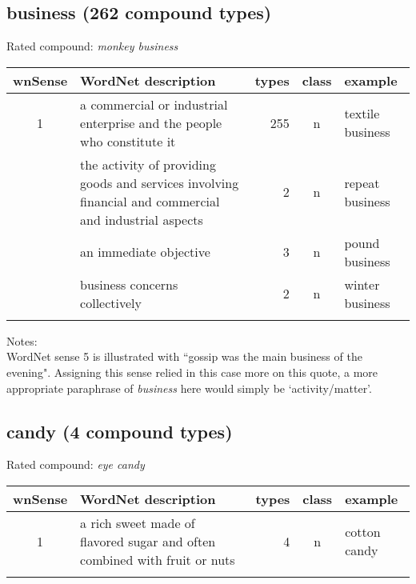 \subsection{business (262 compound types)}
Rated compound: \emph{monkey business}


\noindent
\begin{longtable}{c>{\raggedright\arraybackslash}p{5cm}rc>{\raggedright\arraybackslash}p{2cm}}\lsptoprule
{\small wnSense}&WordNet description&types&class&example\\\midrule
1&a commercial or industrial enterprise and the people who constitute it&255&n&textile business\\\tablevspace
2&the activity of providing goods and services involving financial and commercial and industrial aspects&2&n&repeat business\\\tablevspace
5&an immediate objective&3&n&pound business\\\tablevspace
7&business concerns collectively&2&n&winter business\\\lspbottomrule
\end{longtable}

\noindent
Notes:\\
WordNet sense 5 is illustrated with ``gossip was the main business of the evening". Assigning this sense relied in this case more on this quote, a more appropriate paraphrase of \emph{business} here would simply be `activity/matter'.

\subsection{candy     (4 compound types)}
Rated compound: \emph{eye candy}

\vspace*{1ex}

\noindent
\begin{longtable}{c>{\raggedright\arraybackslash}p{5cm}rc>{\raggedright\arraybackslash}p{2cm}}\lsptoprule
{\small wnSense}&WordNet description&types&class&example\\\midrule
1&a rich sweet made of flavored sugar and often combined with fruit or nuts&4&n&cotton candy\\\lspbottomrule
\end{longtable}


